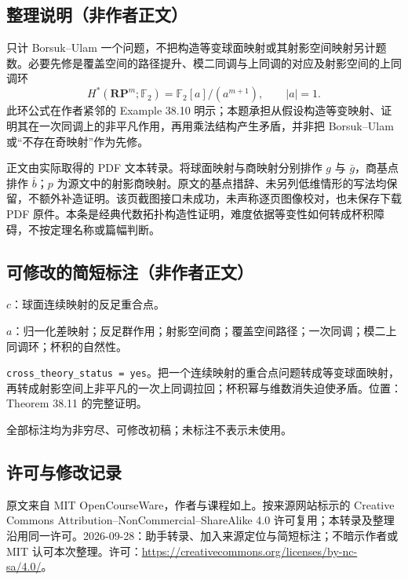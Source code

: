 \documentclass[UTF8,11pt]{ctexart}
\theoremstyle{definition}
\begin{document}
\subsection*{整理说明（非作者正文）}
只计 Borsuk--Ulam 一个问题，不把构造等变球面映射或其射影空间映射另计题数。必要先修是覆盖空间的路径提升、模二同调与上同调的对应及射影空间的上同调环
\[
H^*(\mathbf{RP}^m;\mathbb F_2)=\mathbb F_2[a]/(a^{m+1}),\qquad |a|=1.
\]
此环公式在作者紧邻的 Example 38.10 明示；本题承担从假设构造等变映射、证明其在一次同调上的非平凡作用，再用乘法结构产生矛盾，并非把 Borsuk--Ulam 或“不存在奇映射”作为先修。

正文由实际取得的 PDF 文本转录。将球面映射与商映射分别排作 $g$ 与 $\bar g$，商基点排作 $\bar b$；$p$ 为源文中的射影商映射。原文的基点措辞、未另列低维情形的写法均保留，不额外补造证明。该页截图接口未成功，未声称逐页图像校对，也未保存下载 PDF 原件。本条是经典代数拓扑构造性证明，难度依据等变性如何转成杯积障碍，不按定理名称或篇幅判断。
\subsection*{可修改的简短标注（非作者正文）}
$c$：球面连续映射的反足重合点。

$a$：归一化差映射；反足群作用；射影空间商；覆盖空间路径；一次同调；模二上同调环；杯积的自然性。

\texttt{cross\_theory\_status = yes}。把一个连续映射的重合点问题转成等变球面映射，再转成射影空间上非平凡的一次上同调拉回；杯积幂与维数消失迫使矛盾。位置：Theorem 38.11 的完整证明。

全部标注均为非穷尽、可修改初稿；未标注不表示未使用。
\subsection*{许可与修改记录}
原文来自 MIT OpenCourseWare，作者与课程如上。按来源网站标示的 Creative Commons Attribution--NonCommercial--ShareAlike 4.0 许可复用；本转录及整理沿用同一许可。2026-09-28：助手转录、加入来源定位与简短标注；不暗示作者或 MIT 认可本次整理。许可：\url{https://creativecommons.org/licenses/by-nc-sa/4.0/}。
\end{document}
